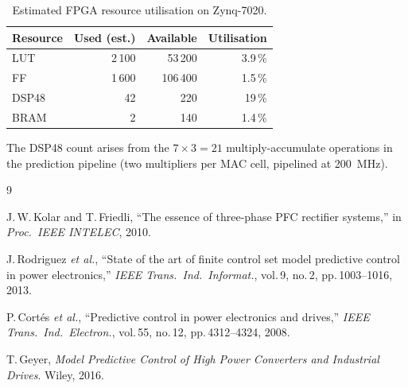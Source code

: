 \documentclass[11pt,a4paper]{article}
\begin{document}
\begin{table}[htbp]
  \centering
  \caption{Estimated FPGA resource utilisation on Zynq-7020.}
  \label{tab:resources}
  \begin{tabular}{lrrr}
    \toprule
    Resource & Used (est.) & Available & Utilisation \\
    \midrule
    LUT      & 2\,100  & 53\,200  & 3.9\,\% \\
    FF       & 1\,600  & 106\,400 & 1.5\,\% \\
    DSP48    & 42      & 220      & 19\,\% \\
    BRAM     & 2       & 140      & 1.4\,\% \\
    \bottomrule
  \end{tabular}
\end{table}

The DSP48 count arises from the $7 \times 3 = 21$ multiply-accumulate
operations in the prediction pipeline (two multipliers per MAC cell,
pipelined at \SI{200}{\MHz}).

\begin{thebibliography}{9}

J.\,W.\,Kolar and T.\,Friedli,
``The essence of three-phase PFC rectifier systems,''
in \emph{Proc.\ IEEE INTELEC}, 2010.

J.\,Rodriguez \textit{et al.},
``State of the art of finite control set model predictive control in power
electronics,''
\emph{IEEE Trans.\ Ind.\ Informat.}, vol.\,9, no.\,2, pp.\,1003--1016, 2013.

P.\,Cortés \textit{et al.},
``Predictive control in power electronics and drives,''
\emph{IEEE Trans.\ Ind.\ Electron.}, vol.\,55, no.\,12,
pp.\,4312--4324, 2008.

T.\,Geyer,
\emph{Model Predictive Control of High Power Converters and Industrial
Drives}. Wiley, 2016.

\end{thebibliography}
\end{document}
